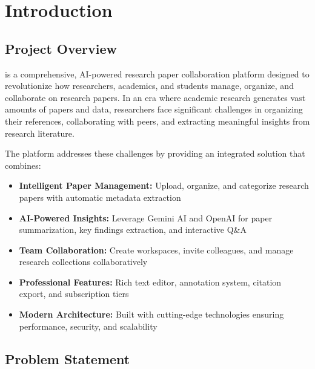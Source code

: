 \chapter{Introduction}
\label{ch:introduction}

\section{Project Overview}
\label{sec:project-overview}

\projectname{} is a comprehensive, AI-powered research paper collaboration platform designed to revolutionize how researchers, academics, and students manage, organize, and collaborate on research papers. In an era where academic research generates vast amounts of papers and data, researchers face significant challenges in organizing their references, collaborating with peers, and extracting meaningful insights from research literature.

\vspace{0.5cm}
\noindent
The platform addresses these challenges by providing an integrated solution that combines:

\begin{itemize}[leftmargin=*]
    \item \textbf{Intelligent Paper Management:} Upload, organize, and categorize research papers with automatic metadata extraction
    \item \textbf{AI-Powered Insights:} Leverage Gemini AI and OpenAI for paper summarization, key findings extraction, and interactive Q\&A
    \item \textbf{Team Collaboration:} Create workspaces, invite colleagues, and manage research collections collaboratively
    \item \textbf{Professional Features:} Rich text editor, annotation system, citation export, and subscription tiers
    \item \textbf{Modern Architecture:} Built with cutting-edge technologies ensuring performance, security, and scalability
\end{itemize}

\section{Problem Statement}
\label{sec:problem-statement}

